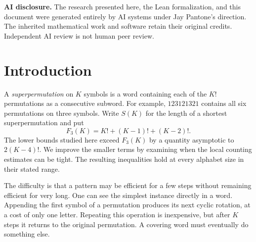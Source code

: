 \begin{abstract}
A short superpermutation must make extensive use of large overlaps between
successive permutations. These overlaps organize the permutations into
runs, and earlier lower bounds control how efficiently such runs can be
joined. We strengthen this part of the argument. The patterns that attain
the earlier estimates cannot keep repeating: their action on the symbols
eventually brings them back to a rotation class already visited. In one
case, two repetitions already have an entire run in common. Counting the
necessary departures from these patterns gives an explicit lower bound
valid for every alphabet size at least eight. It improves the preceding
general formula at every size at least thirteen not divisible by three.
The leading correction above $K!+(K-1)!+(K-2)!$ remains asymptotic
to $2(K-4)!$. The exact formulas and their asymptotic comparisons have
formal proofs in Lean.
\end{abstract}

\noindent\textbf{AI disclosure.} The research presented here, the Lean
formalization, and this document were generated entirely by AI systems
under Jay Pantone's direction. The inherited mathematical work and
software retain their original credits. Independent AI review is not
human peer review.

\section{Introduction}

A \emph{superpermutation} on $K$ symbols is a word containing each of the
$K!$ permutations as a consecutive subword. For example, $123121321$
contains all six permutations on three symbols. Write $S(K)$ for the
length of a shortest superpermutation and put
\[
 F_3(K)=K!+(K-1)!+(K-2)!.
\]
The lower bounds studied here exceed $F_3(K)$ by a quantity asymptotic
to $2(K-4)!$. We improve the smaller terms by examining when the local
counting estimates can be tight. The resulting inequalities hold at every
alphabet size in their stated range.

The difficulty is that a pattern may be efficient for a few steps without
remaining efficient for very long. One can see the simplest instance
directly in a word. Appending the first symbol of a permutation produces
its next cyclic rotation, at a cost of only one letter. Repeating this
operation is inexpensive, but after $K$ steps it returns to the original
permutation. A covering word must eventually do something else.

